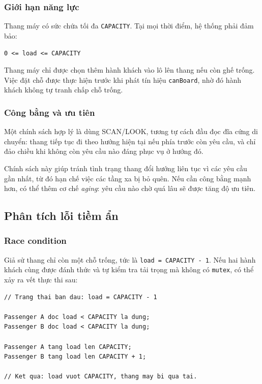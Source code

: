 \subsubsection*{Giới hạn năng lực}

Thang máy có sức chứa tối đa \texttt{CAPACITY}. Tại mọi thời điểm, hệ
thống phải đảm bảo:

\begin{center}
\texttt{0 <= load <= CAPACITY}
\end{center}

Thang máy chỉ được chọn thêm hành khách vào lô lên thang nếu còn ghế
trống. Việc đặt chỗ được thực hiện trước khi phát tín hiệu
\texttt{canBoard}, nhờ đó hành khách không tự tranh chấp chỗ trống.

\subsubsection*{Công bằng và ưu tiên}

Một chính sách hợp lý là dùng SCAN/LOOK, tương tự cách đầu đọc đĩa cứng
di chuyển: thang tiếp tục đi theo hướng hiện tại nếu phía trước còn yêu
cầu, và chỉ đảo chiều khi không còn yêu cầu nào đáng phục vụ ở hướng đó.

Chính sách này giúp tránh tình trạng thang đổi hướng liên tục vì các yêu
cầu gần nhất, từ đó hạn chế việc các tầng xa bị bỏ quên. Nếu cần công
bằng mạnh hơn, có thể thêm cơ chế \textit{aging}: yêu cầu nào chờ quá lâu
sẽ được tăng độ ưu tiên.

\subsection{Phân tích lỗi tiềm ẩn}

\subsubsection*{Race condition}

Giả sử thang chỉ còn một chỗ trống, tức là
\texttt{load = CAPACITY - 1}. Nếu hai hành khách cùng được đánh thức và
tự kiểm tra tải trọng mà không có \texttt{mutex}, có thể xảy ra vết thực
thi sau:

\begin{lstlisting}
// Trang thai ban dau: load = CAPACITY - 1

Passenger A doc load < CAPACITY la dung;
Passenger B doc load < CAPACITY la dung;

Passenger A tang load len CAPACITY;
Passenger B tang load len CAPACITY + 1;

// Ket qua: load vuot CAPACITY, thang may bi qua tai.
\end{lstlisting}


